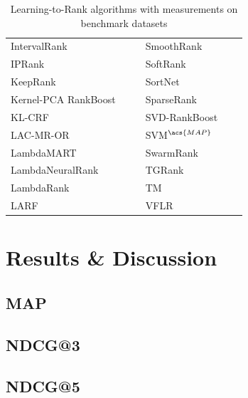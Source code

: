 \begin{table}[!h]
{\begin{tabular}{|l|l|l||l|l|l|}
IntervalRank & \cite{Moon2010} & \cite{Moon2010, Freno2011} & SmoothRank & \cite{Chapelle2010} & \cite{Chapelle2010} \\ 
\acs{IP}Rank & \cite{Wang2009b} & \cite{Wang2009b, Torkestani2012} & SoftRank & \cite{Taylor2008, Guiver2008} & \cite{Qin2010b} \\ 
KeepRank & \cite{Chen2009} & \cite{Chen2009} & SortNet & \cite{Rigutini2008} & \cite{Rigutini2008,Freno2011} \\ 
Kernel-\acs{PCA} RankBoost & \cite{Duh2008} & \cite{Duh2008, Sato2013} & SparseRank & \cite{Lai2013b} & \cite{Lai2013b} \\ 
KL-\acs{CRF} & \cite{Volkovs2011} & \cite{Volkovs2011} & \acs{SVD}-RankBoost & \cite{Lin2009} & \cite{Lin2009} \\ 
LAC-MR-OR & \cite{Veloso2008} & \cite{Veloso2008} & \acs{SVM}$^{\acs{MAP}}$ & \cite{Yue2007} & \cite{Wang2012, Xu2008, Niu2012} \\ 
LambdaMART & \cite{Burges2010} & \cite{Asadi2013a, Ganjisaffar2011c} & SwarmRank & \cite{Diaz-Aviles2009} & \cite{Sato2013} \\ 
LambdaNeuralRank & \cite{Papini2012} & \cite{Papini2012} & TGRank & \cite{Lai2013} & \cite{Lai2013} \\ 
LambdaRank & \cite{Burges2006} &  & TM & \cite{Zhou2008} & \cite{Zhou2008, Papini2012, Tan2013} \\ 
LARF & \cite{Torkestani2012} & \cite{Torkestani2012} & VFLR & \cite{Cai2012} & \cite{Cai2012} \\ 
\end{tabular}}
\caption{Learning-to-Rank algorithms with measurements on benchmark datasets}
\label{ltr_methods_used}
\end{table}

\section{Results \& Discussion}
\subsection{MAP}

\subsection{NDCG@3}

\subsection{NDCG@5}

